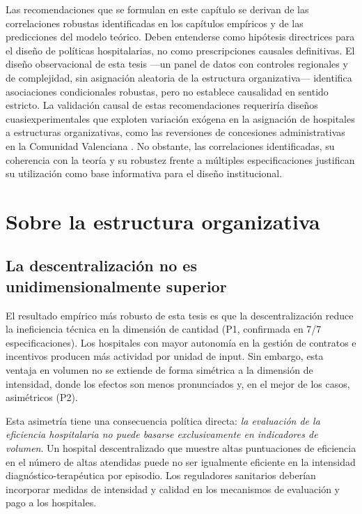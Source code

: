 \documentclass[12pt, a4paper, twoside, openright]{book}
\theoremstyle{plain}
\theoremstyle{definition}
\theoremstyle{remark}
\begin{document}
Las recomendaciones que se formulan en este capítulo se derivan de las correlaciones robustas identificadas en los capítulos empíricos y de las predicciones del modelo teórico. Deben entenderse como hipótesis directrices para el diseño de políticas hospitalarias, no como prescripciones causales definitivas. El diseño observacional de esta tesis ---un panel de datos con controles regionales y de complejidad, sin asignación aleatoria de la estructura organizativa--- identifica asociaciones condicionales robustas, pero no establece causalidad en sentido estricto. La validación causal de estas recomendaciones requeriría diseños cuasiexperimentales que exploten variación exógena en la asignación de hospitales a estructuras organizativas, como las reversiones de concesiones administrativas en la Comunidad Valenciana \citep[véase][para una discusión de estos diseños]{angrist2009}. No obstante, las correlaciones identificadas, su coherencia con la teoría y su robustez frente a múltiples especificaciones justifican su utilización como base informativa para el diseño institucional.

\section{Sobre la estructura organizativa}

\subsection{La descentralización no es unidimensionalmente superior}

El resultado empírico más robusto de esta tesis es que la descentralización reduce la ineficiencia técnica en la dimensión de cantidad (P1, confirmada en 7/7 especificaciones). Los hospitales con mayor autonomía en la gestión de contratos e incentivos producen más actividad por unidad de input. Sin embargo, esta ventaja en volumen no se extiende de forma simétrica a la dimensión de intensidad, donde los efectos son menos pronunciados y, en el mejor de los casos, asimétricos (P2).

Esta asimetría tiene una consecuencia política directa: \textit{la evaluación de la eficiencia hospitalaria no puede basarse exclusivamente en indicadores de volumen}. Un hospital descentralizado que muestre altas puntuaciones de eficiencia en el número de altas atendidas puede no ser igualmente eficiente en la intensidad diagnóstico-terapéutica por episodio. Los reguladores sanitarios deberían incorporar medidas de intensidad y calidad en los mecanismos de evaluación y pago a los hospitales.
\end{document}
